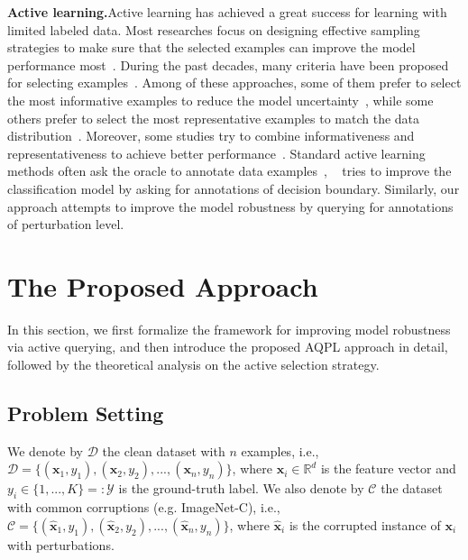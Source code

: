 \documentclass[letterpaper]{article} %
\begin{document}
\textbf{Active learning.}\quad Active learning has achieved a great success for learning with limited labeled data. Most researches focus on designing effective sampling strategies to make sure that the selected examples can improve the model performance most~\cite{fu2013survey}. During the past decades, many criteria have been proposed for selecting examples~\cite{fu2013survey,huang2010active,lewis1994sequential,seung1992query,you2014diverse,geman1992neural,roy2001toward}. Among of these approaches, some of them prefer to select the most informative examples to reduce the model uncertainty~\cite{lewis1994sequential,seung1992query,you2014diverse}, while some others prefer to select the most representative examples to match the data distribution~\cite{geman1992neural,roy2001toward}. Moreover, some studies try to combine informativeness and representativeness to achieve better performance~\cite{huang2013active,huang2010active}. Standard active learning methods often ask the oracle to annotate data examples~\cite{fu2013survey}, ~\cite{huijser2017active} tries to improve the classification model by asking for annotations of decision boundary. Similarly, our approach attempts to improve the model robustness by querying for annotations of perturbation level.


\section{The Proposed Approach}
In this section, we first formalize the framework for improving model robustness via active querying, and then introduce the proposed AQPL approach in detail, followed by the theoretical analysis on the active selection strategy.

\subsection{Problem Setting}
%
We denote by $\mathcal{D}$ the clean dataset with $n$ examples, i.e., $\mathcal{D}=\{(\mathbf{x}_1,y_1),(\mathbf{x}_2,y_2),...,(\mathbf{x}_n,y_n)\}$, where $\mathbf{x}_i \in \mathbb{R}^d$ is the feature vector and $y_i \in \{1,...,K\} =: \mathcal{Y}$ is the ground-truth label. We also denote by $\mathcal{C}$ the dataset with common corruptions (e.g. ImageNet-C), i.e., $\mathcal{C}=\{(\hat{\mathbf{x}}_1,y_1),(\hat{\mathbf{x}}_2,y_2),...,(\hat{\mathbf{x}}_n,y_n)\}$, where $\hat{\mathbf{x}}_i$ is the corrupted instance of $\mathbf{x}_i$ with perturbations.
\end{document}
